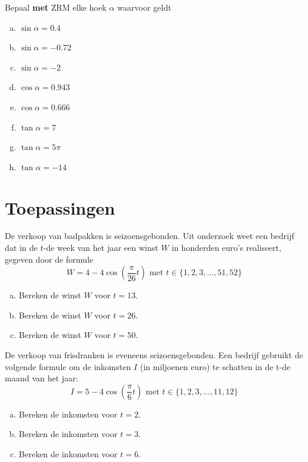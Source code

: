 \documentclass[a4paper,12pt,twoside]{article}
\begin{document}
\begin{oefening}
Bepaal \textbf{met} ZRM elke hoek $\alpha$ waarvoor geldt
\begin{enumerate}[(a)]
  \item $\sin\alpha=0.4$
  \item $\sin\alpha=-0.72$
  \item $\sin\alpha=-2$
  \item $\cos\alpha=0.943$
  \item $\cos\alpha=0.666$
  \item $\tan\alpha=7$
  \item $\tan\alpha=5\pi$
  \item $\tan\alpha=-14$
\end{enumerate}
\end{oefening}

\cleardoublepage
\section{Toepassingen}

\begin{oefening}
De verkoop van badpakken is seizoensgebonden. Uit onderzoek weet een bedrijf dat in de $t$-de week van het jaar een winst $W$ in honderden euro's realiseert, gegeven door de formule
$$W=4-4\cos\left(\dfrac{\pi}{26}t\right) \mbox{ met } t\in \{1,2,3,\ldots,51,52\}$$
\begin{enumerate}[(a)]
  \item Bereken de winst $W$ voor $t=13$.
  \item Bereken de winst $W$ voor $t=26$.
  \item Bereken de winst $W$ voor $t=50$.
\end{enumerate}
\end{oefening}

\begin{oefening}
De verkoop van frisdranken is eveneens seizoensgebonden. Een bedrijf gebruikt de volgende formule om de inkomsten $I$ (in miljoenen euro) te schatten in de t-de maand van het jaar:
$$I=5-4\cos\left(\dfrac{\pi}{6}t\right) \mbox{ met } t\in \{1,2,3,...,11,12\}$$
\begin{enumerate}[(a)]
  \item Bereken de inkomsten voor $t=2$.
  \item Bereken de inkomsten voor $t=3$.
  \item Bereken de inkomsten voor $t=6$.
\end{enumerate}
\end{oefening}
\end{document}
